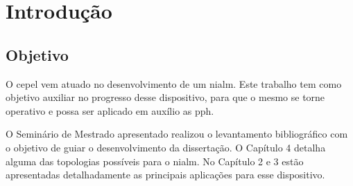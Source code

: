 \chapter{Introdução}

\section{Objetivo}

O \gls{cepel} vem atuado no desenvolvimento de um \gls{nialm}. Este trabalho
tem como objetivo auxiliar no progresso desse dispositivo, para que o
mesmo se torne operativo e possa ser aplicado em auxílio as \gls{pph}.

O Seminário de Mestrado apresentado realizou o levantamento bibliográfico com o
objetivo de guiar o desenvolvimento da dissertação. O Capítulo 4 detalha alguma
das topologias possíveis para o \gls{nialm}. No Capítulo 2 e 3 estão
apresentadas detalhadamente as principais aplicações para esse dispositivo.






